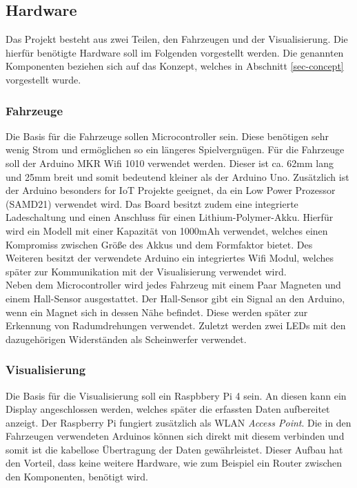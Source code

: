 \documentclass[.../Dokumentation.tex]{subfiles}
\begin{document}
\subsection{Hardware}\label{sec-components-hardware}
Das Projekt besteht aus zwei Teilen, den Fahrzeugen und der Visualisierung.
Die hierfür benötigte Hardware soll im Folgenden vorgestellt werden.
Die genannten Komponenten beziehen sich auf das Konzept, welches in Abschnitt 
\ref{sec-concept} vorgestellt wurde.
\subsubsection{Fahrzeuge}
Die Basis für die Fahrzeuge sollen Microcontroller sein. Diese benötigen sehr 
wenig Strom und ermöglichen so ein längeres Spielvergnügen. 
Für die Fahrzeuge soll der Arduino MKR Wifi 1010 verwendet werden. Dieser ist 
ca. 62mm lang und 25mm breit und somit bedeutend kleiner als der Arduino Uno. 
Zusätzlich ist der Arduino besonders for IoT Projekte geeignet, da ein Low 
Power Prozessor (SAMD21) verwendet wird. Das Board besitzt zudem eine 
integrierte Ladeschaltung und einen Anschluss für einen Lithium-Polymer-Akku. 
Hierfür wird ein Modell mit einer Kapazität von 1000mAh verwendet, welches 
einen Kompromiss zwischen Größe des Akkus und dem Formfaktor bietet. Des 
Weiteren besitzt der verwendete Arduino ein integriertes Wifi Modul, welches 
später zur Kommunikation mit der Visualisierung verwendet wird. \\
Neben dem Microcontroller wird jedes Fahrzeug mit einem Paar Magneten und einem 
Hall-Sensor ausgestattet. Der Hall-Sensor gibt ein Signal an den Arduino, 
wenn ein Magnet sich in dessen Nähe befindet. Diese werden später zur Erkennung 
von Radumdrehungen verwendet. Zuletzt werden zwei LEDs mit den dazugehörigen 
Widerständen als Scheinwerfer verwendet.

\subsubsection{Visualisierung}
Die Basis für die Visualisierung soll ein Raspbbery Pi 4 sein. An diesen kann 
ein Display angeschlossen werden, welches später die erfassten Daten 
aufbereitet anzeigt. Der Raspberry Pi fungiert zusätzlich als WLAN 
\textit{Access Point}. Die in den Fahrzeugen verwendeten Arduinos können sich 
direkt mit diesem verbinden und somit ist die kabellose Übertragung der Daten 
gewährleistet. Dieser Aufbau hat den Vorteil, dass keine weitere 
Hardware, wie zum Beispiel ein Router zwischen den Komponenten, benötigt wird.
\end{document}

